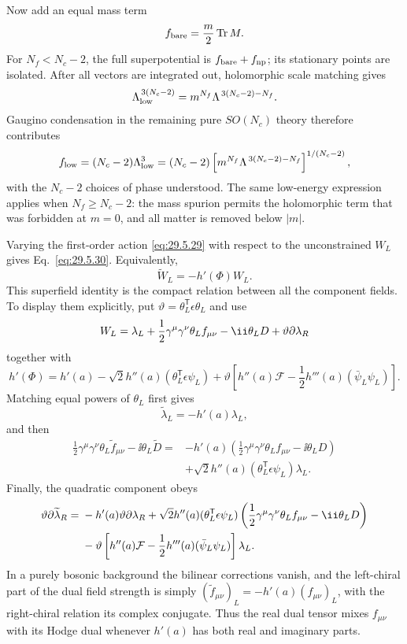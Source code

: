 \begin{enumerate}
  Now add an equal mass term
  \[
    f_{\rm bare}=\frac{m}{2}\operatorname{Tr}M.
  \]
  For \(N_f<N_c-2\), the full superpotential is
  \(f_{\rm bare}+f_{\rm np}\); its stationary points are isolated.
  After all vectors are integrated out, holomorphic scale matching gives
  \[
    \Lambda_{\rm low}^{\,3(N_c-2)}
      =m^{N_f}\Lambda^{\,3(N_c-2)-N_f}.
  \]
  Gaugino condensation in the remaining pure \(SO(N_c)\) theory
  therefore contributes
  \[
    f_{\rm low}
      =(N_c-2)\Lambda_{\rm low}^{3}
      =(N_c-2)
       \left[
         m^{N_f}\Lambda^{\,3(N_c-2)-N_f}
       \right]^{1/(N_c-2)},
  \]
  with the \(N_c-2\) choices of phase understood.  The same low-energy
  expression applies when \(N_f\geq N_c-2\): the mass spurion permits the
  holomorphic term that was forbidden at \(m=0\), and all matter is
  removed below \(\lvert m\rvert\).

  Varying the first-order action \eqref{eq:29.5.29} with respect to the
  unconstrained \(W_L\) gives Eq.~\eqref{eq:29.5.30}.  Equivalently,
  \[
    \widetilde W_L=-h'(\Phi)W_L.
  \]
  This superfield identity is the compact relation between all the
  component fields.  To display them explicitly, put
  \(\vartheta=\theta_L^{\mathsf T}\epsilon\theta_L\) and use
  \[
    W_L=\lambda_L+
      \frac12\gamma^\mu\gamma^\nu\theta_L f_{\mu\nu}
      -\ii\theta_LD+\vartheta\sl{\partial}\lambda_R
  \]
  together with
  \[
    h'(\Phi)
      =h'(a)-\sqrt2h''(a)
        (\theta_L^{\mathsf T}\epsilon\psi_L)
       +\vartheta\left[
          h''(a)\mathcal F
          -\frac12h'''(a)(\bar\psi_L\psi_L)
        \right].
  \]
  Matching equal powers of \(\theta_L\) first gives
  \[
    \widetilde\lambda_L=-h'(a)\lambda_L,
  \]
  and then
  \[
    \begin{aligned}
    \frac12\gamma^\mu\gamma^\nu\theta_L\widetilde f_{\mu\nu}
      -\ii\theta_L\widetilde D
    ={}&
      -h'(a)\left(
        \frac12\gamma^\mu\gamma^\nu\theta_L f_{\mu\nu}
        -\ii\theta_LD
      \right)
    \\
    &+\sqrt2h''(a)
      (\theta_L^{\mathsf T}\epsilon\psi_L)\lambda_L .
    \end{aligned}
  \]
  Finally, the quadratic component obeys
  \[
    \begin{aligned}
    \vartheta\sl{\partial}\widetilde\lambda_R
    ={}&
      -h'(a)\vartheta\sl{\partial}\lambda_R
      +\sqrt2h''(a)(\theta_L^{\mathsf T}\epsilon\psi_L)
       \left(
        \frac12\gamma^\mu\gamma^\nu\theta_L f_{\mu\nu}
        -\ii\theta_LD
       \right)
    \\
    &-\vartheta\left[
       h''(a)\mathcal F
       -\frac12h'''(a)(\bar\psi_L\psi_L)
      \right]\lambda_L .
    \end{aligned}
  \]
  In a purely bosonic background the bilinear corrections vanish, and
  the left-chiral part of the dual field strength is simply
  \((\widetilde f_{\mu\nu})_L=-h'(a)(f_{\mu\nu})_L\), with the
  right-chiral relation its complex conjugate.  Thus the real dual
  tensor mixes \(f_{\mu\nu}\) with its Hodge dual whenever \(h'(a)\) has
  both real and imaginary parts.
\end{enumerate}
